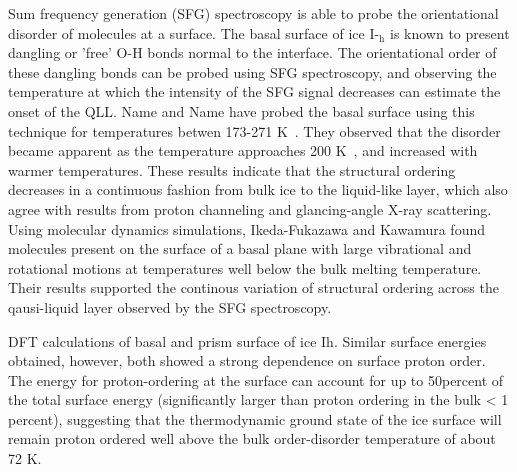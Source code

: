 Sum frequency generation (SFG) spectroscopy is able to probe the
orientational disorder of molecules at a surface. The basal surface of
ice I-$_\mathrm{h}$ is known to present dangling or 'free' O-H bonds
normal to the interface. The orientational order of these dangling
bonds can be probed using SFG spectroscopy, and observing the
temperature at which the intensity of the SFG signal decreases can
estimate the onset of the QLL. Name and Name have probed the basal
surface using this technique for temperatures betwen 173-271
K~.\cite{Wei2001,Wei2002} They observed that the disorder became apparent
as the temperature approaches 200 K~, and increased with warmer
temperatures.  These results indicate that the structural ordering
decreases in a continuous fashion from bulk ice to the liquid-like
layer, which also agree with results from proton channeling and
glancing-angle X-ray scattering.\cite{Golecki1978,Dosch1995} Using
molecular dynamics simulations, Ikeda-Fukazawa and Kawamura found
molecules present on the surface of a basal plane with large
vibrational and rotational motions at temperatures well below the bulk
melting temperature.\cite{Ikeda-Fukazawa2004} Their results supported
the continous variation of structural ordering across the qausi-liquid
layer observed by the SFG spectroscopy.

DFT calculations of basal and prism surface of ice Ih. Similar surface
energies obtained, however, both showed a strong dependence on surface
proton order. The energy for proton-ordering at the surface can
account for up to 50percent of the total surface energy (significantly
larger than proton ordering in the bulk < 1 percent), suggesting that
the thermodynamic ground state of the ice surface will remain proton
ordered well above the bulk order-disorder temperature of about 72 K.

